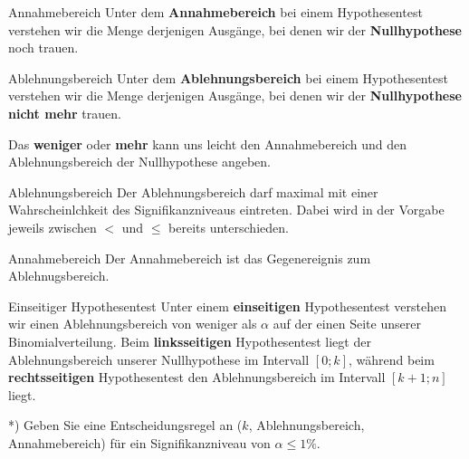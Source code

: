 \begin{definition}{Annahmebereich}{}
  Unter dem \textbf{Annahmebereich} bei einem Hypothesentest verstehen
  wir die Menge derjenigen Ausgänge, bei denen wir der
  \textbf{Nullhypothese} noch trauen.
\end{definition}

\begin{definition}{Ablehnungsbereich}{}
  Unter dem \textbf{Ablehnungsbereich} bei einem Hypothesentest verstehen
  wir die Menge derjenigen Ausgänge, bei denen wir der
  \textbf{Nullhypothese} \textbf{nicht mehr} trauen.
\end{definition}




Das \textbf{weniger} oder \textbf{mehr} kann uns leicht den Annahmebereich und den Ablehnungsbereich der Nullhypothese angeben.

\begin{gesetz}{Ablehnungsbereich}{}
  Der Ablehnungsbereich darf maximal mit einer Wahrscheinlchkeit des Signifikanzniveaus eintreten. Dabei wird in der Vorgabe jeweils zwischen $<$ und $\le$ bereits unterschieden.
\end{gesetz}

\begin{gesetz}{Annahmebereich}{}
  Der Annahmebereich ist das Gegenereignis zum Ablehnugsbereich.
\end{gesetz}


\begin{definition}{Einseitiger Hypothesentest}{}
Unter einem \textbf{einseitigen} Hypothesentest verstehen wir einen Ablehnungsbereich von weniger als $\alpha$ auf der einen Seite unserer Binomialverteilung. Beim \textbf{linksseitigen} Hypothesentest liegt der Ablehnungsbereich unserer Nullhypothese im Intervall $[0; k]$, während beim \textbf{rechtsseitigen} Hypothesentest den Ablehnungsbereich im Intervall $[k+1;n]$ liegt.
  \end{definition}

\newpage



*) Geben Sie eine Entscheidungsregel an ($k$, Ablehnungsbereich, Annahmebereich) für ein Signifikanzniveau von $\alpha \le 1\%$.



